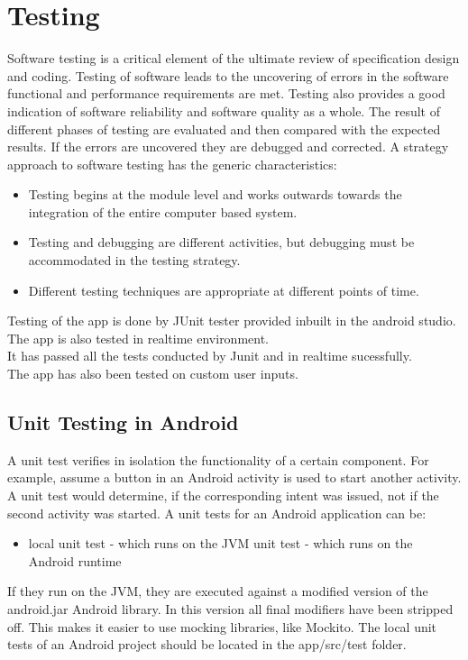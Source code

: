\section{Testing}
Software testing is a critical element of the ultimate review of specification design and coding. Testing of software leads to the uncovering of errors in the software functional and
performance requirements are met. Testing also provides a good indication of software reliability and software quality as a whole. The result of different phases of testing are evaluated and then compared with the expected results. If the errors are uncovered they are debugged and corrected. A strategy approach to software testing has the generic characteristics:
\begin{itemize}
	\item Testing begins at the module level and works outwards towards the integration of
	the entire computer based system.
	\item Testing and debugging are different activities, but debugging must be accommodated in the testing strategy.
	\item Different testing techniques are appropriate at different points of time.
\end{itemize}
Testing of the app is done by JUnit tester provided inbuilt in the android studio.
\\
The app is also tested in realtime environment.\\
It has passed all the tests conducted by Junit and in realtime sucessfully.
\\
The app has also been tested on custom user inputs.
\subsection{Unit Testing in Android}
A unit test verifies in isolation the functionality of a certain component. For example, assume a button in an Android activity is used to start another activity. A unit test would determine, if the corresponding intent was issued, not if the second activity was started.
A unit tests for an Android application can be:
\begin{itemize}
	\item local unit test - which runs on the JVM
	\itemAndroid unit test - which runs on the Android runtime
\end{itemize}
If they run on the JVM, they are executed against a modified version of the android.jar Android library. In this version all final modifiers have been stripped off. This makes it easier to use mocking libraries, like Mockito.
The local unit tests of an Android project should be located in the app/src/test folder.
